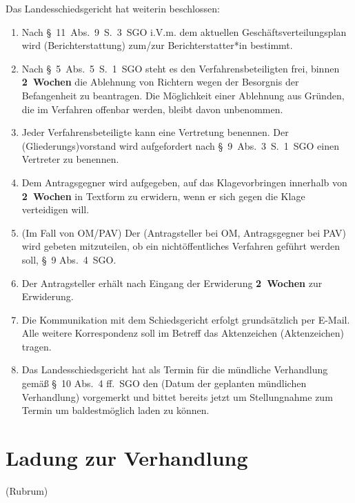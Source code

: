 Das Landesschiedsgericht hat weiterin beschlossen:
\begin{enumerate}
\item Nach §~11~Abs.~9~S.~3~SGO i.V.m. dem aktuellen Geschäftsverteilungsplan wird (Berichterstattung) zum/zur Berichterstatter*in bestimmt.
\item Nach §~5~Abs.~5~S.~1~SGO steht es den Verfahrensbeteiligten frei, binnen \textbf{2~Wochen} die Ablehnung von Richtern wegen der Besorgnis der Befangenheit zu beantragen. Die Möglichkeit einer Ablehnung aus Gründen, die im Verfahren offenbar werden, bleibt davon unbenommen.
\item Jeder Verfahrensbeteiligte kann eine Vertretung benennen. Der (Gliederungs)vorstand wird aufgefordert nach §~9~Abs.~3~S.~1~SGO einen Vertreter zu benennen.
\item Dem Antragsgegner wird aufgegeben, auf das Klagevorbringen innerhalb von \textbf{2~Wochen} in Textform zu erwidern, wenn er sich gegen die Klage verteidigen will.
\item (Im Fall von OM/PAV) Der (Antragsteller bei OM, Antragsgegner bei PAV) wird gebeten mitzuteilen, ob ein nichtöffentliches Verfahren geführt werden soll, \S~9 Abs.~4~SGO.
\item Der Antragsteller erhält nach Eingang der Erwiderung \textbf{2~Wochen} zur Erwiderung.
\item Die Kommunikation mit dem Schiedsgericht erfolgt grundsätzlich per E-Mail. Alle weitere Korrespondenz soll im Betreff das Aktenzeichen (Aktenzeichen) tragen.
\item Das Landesschiedsgericht hat als Termin für die mündliche Verhandlung gemäß \S~10 Abs.~4 ff.~SGO den (Datum der geplanten mündlichen Verhandlung) vorgemerkt und bittet bereits jetzt um Stellungnahme zum Termin um baldestmöglich laden zu können.
\end{enumerate}


\section{Ladung zur Verhandlung}
\label{Vorlage:Verhandlungsladung}
(Rubrum)

